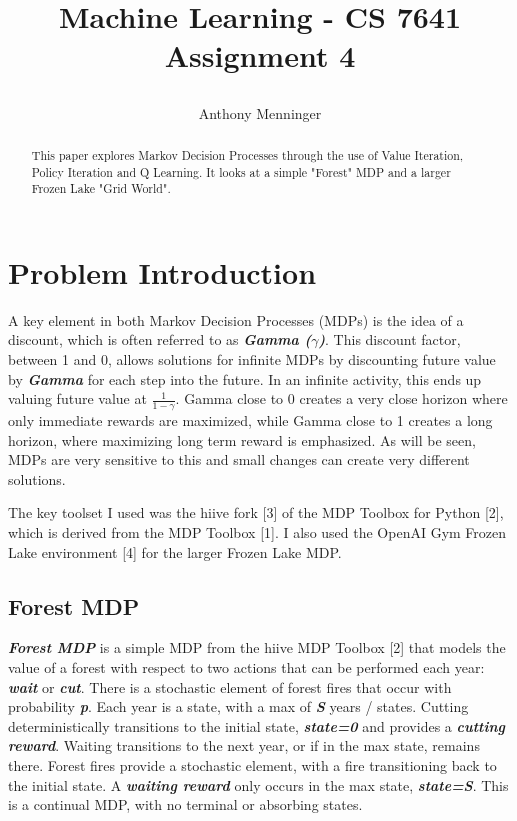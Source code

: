 \documentclass[letterpaper]{article} %
\title{
Machine Learning - CS 7641
Assignment 4
	
}
\author {
    Anthony Menninger \\
}
\begin{document}
\maketitle

\begin{abstract}
This paper explores Markov Decision Processes through the use of Value Iteration, Policy Iteration and Q Learning.  It looks at a simple "Forest" MDP and a larger Frozen Lake "Grid World".
\end{abstract}

\section{Problem Introduction}

A key element in both Markov Decision Processes (MDPs) is the idea of a discount, which is often referred to as \textbf{\emph{Gamma ($\gamma$)}}.  This discount factor, between 1 and 0, allows solutions for infinite MDPs by discounting future value by \textbf{\emph{Gamma}} for each step into the future.  In an infinite activity, this ends up valuing future value at $ \frac{1}{1- \gamma}$.  Gamma close to 0 creates a very close horizon where only immediate rewards are maximized, while Gamma close to 1 creates a long horizon, where maximizing long term reward is emphasized.  As will be seen, MDPs are very sensitive to this and small changes can create very different solutions.

The key toolset I used was the hiive fork [3] of the MDP Toolbox for Python [2], which is derived from the MDP Toolbox [1].  I also used the OpenAI Gym Frozen Lake environment [4] for the larger Frozen Lake MDP.

\subsection{Forest MDP}
\textbf{\emph{Forest MDP}} is a simple MDP from the hiive MDP Toolbox [2] that models the value of a forest with respect to two actions that can be performed each year: \textbf{\emph{wait}} or \textbf{\emph{cut}}.  There is a stochastic element of forest fires that occur with probability \textbf{\emph{p}}.  Each year is a state, with a max of \textbf{\emph{S}} years / states.  Cutting deterministically transitions to the initial state,  \textbf{\emph{state=0}} and provides a \textbf{\emph{cutting reward}}.  Waiting transitions to the next year, or if in the max state, remains there.  Forest fires provide a stochastic element, with a fire transitioning back to the initial state.  A \textbf{\emph{waiting reward}} only occurs in the max state, \textbf{\emph{state=S}}.  This is a continual MDP, with no terminal or absorbing states. 
\end{document}
